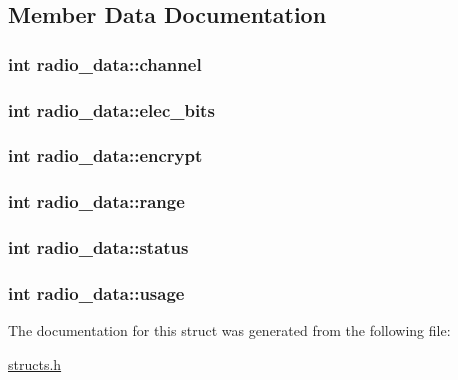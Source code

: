 \subsection{Member Data Documentation}
\hypertarget{structradio__data_a0b1783d8c0fd34039fe105448606b66e}{
\subsubsection[{channel}]{\setlength{\rightskip}{0pt plus 5cm}int radio\-\_\-data\-::channel}}\label{structradio__data_a0b1783d8c0fd34039fe105448606b66e}
\hypertarget{structradio__data_a979087a195c4253ee9fe1913edd4fa4b}{
\subsubsection[{elec\-\_\-bits}]{\setlength{\rightskip}{0pt plus 5cm}int radio\-\_\-data\-::elec\-\_\-bits}}\label{structradio__data_a979087a195c4253ee9fe1913edd4fa4b}
\hypertarget{structradio__data_ac0c2b129bde556a3e3ea8690e1c4adca}{
\subsubsection[{encrypt}]{\setlength{\rightskip}{0pt plus 5cm}int radio\-\_\-data\-::encrypt}}\label{structradio__data_ac0c2b129bde556a3e3ea8690e1c4adca}
\hypertarget{structradio__data_a013678e8f4bdb0bcd7365b1e289b908d}{
\subsubsection[{range}]{\setlength{\rightskip}{0pt plus 5cm}int radio\-\_\-data\-::range}}\label{structradio__data_a013678e8f4bdb0bcd7365b1e289b908d}
\hypertarget{structradio__data_a4335da12f27e590f42298c2794a2c3a3}{
\subsubsection[{status}]{\setlength{\rightskip}{0pt plus 5cm}int radio\-\_\-data\-::status}}\label{structradio__data_a4335da12f27e590f42298c2794a2c3a3}
\hypertarget{structradio__data_acdf7274e14930ea7a9fa1d393482b1d7}{
\subsubsection[{usage}]{\setlength{\rightskip}{0pt plus 5cm}int radio\-\_\-data\-::usage}}\label{structradio__data_acdf7274e14930ea7a9fa1d393482b1d7}


The documentation for this struct was generated from the following file\-:\begin{DoxyCompactItemize}
\item 
\hyperlink{structs_8h}{structs.\-h}\end{DoxyCompactItemize}
